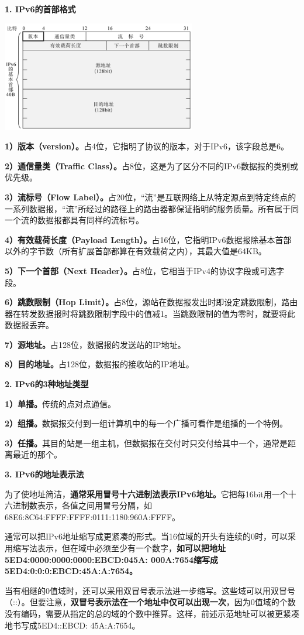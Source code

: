 {\textbf{{1. IPv6的首部格式}}}

\includegraphics[width=3.33333in,height=1.89583in]{png-jpeg-pics/AB77CD74448F1E8AD96A989EBCB203E3.png}

\textbf{1）版本（version）。}占4位，它指明了协议的版本，对于IPv6，该字段总是6。

\textbf{2）通信量类（Traffic
Class）。}占8位，这是为了区分不同的IPv6数据报的类别或优先级。

\textbf{3）流标号（Flow
Label）。}占20位，``流''是互联网络上从特定源点到特定终点的一系列数据报，``流''所经过的路径上的路由器都保证指明的服务质量。所有属于同一个流的数据报都具有同样的流标号。

\textbf{4）有效载荷长度（Payload
Length）。}占16位，它指明IPv6数据报除基本首部以外的字节数（所有扩展首部都算在有效载荷之内），其最大值是64KB。

\textbf{5）下一个首部（Next
Header）。}占8位，它相当于IPv4的协议字段或可选字段。

\textbf{6）跳数限制（Hop
Limit）。}占8位，源站在数据报发出时即设定跳数限制，路由器在转发数据报时将跳数限制字段中的值减1。当跳数限制的值为零时，就要将此数据报丢弃。

\textbf{7）源地址。}占128位，数据报的发送站的IP地址。

\textbf{8）目的地址。}占128位，数据报的接收站的IP地址。

\textbf{{2. IPv6的3种地址类型}}

\textbf{1）单播。}传统的点对点通信。

\textbf{2）组播。}数据报交付到一组计算机中的每一个广播可看作是组播的一个特例。

\textbf{3）任播。}其目的站是一组主机，但数据报在交付时只交付给其中一个，通常是距离最近的那个。

{\textbf{3. IPv6的地址表示法}}

为了使地址简洁，{\textbf{通常采用冒号十六进制法表示IPv6地址。}}它把每16bit用一个十六进制数表示，各值之间用冒号分隔，如68E6:8C64:FFFF:FFFF:0111:1180:960A:FFFF。

通常可以把IPv6地址缩写成更紧凑的形式。当16位域的开头有连续的0时，可以采用缩写法表示，但在域中必须至少有一个数字，\textbf{{如可以把地址5ED4:0000:0000:0000:EBCD:045A:
000A:7654缩写成5ED4:0:0:0:EBCD:45A:A:7654。}}

当有相继的0值域时，还可以采用双冒号表示法进一步缩写。这些域可以用双冒号（::）。但要注意，{\textbf{双冒号表示法在一个地址中仅可以出现一次}}，因为0值域的个数没有编码，需要从指定的总的域的个数中推算。这样，前述示范地址可以被更紧凑地书写成5ED4::EBCD:
45A:A:7654。
